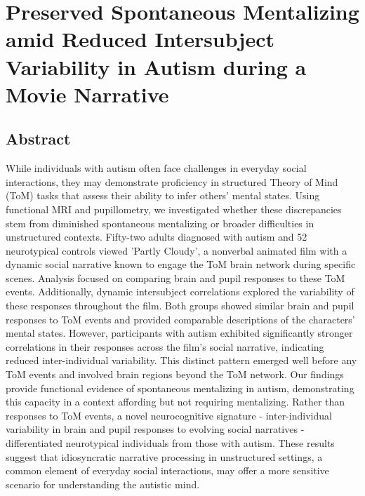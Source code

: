 \chapter{Preserved Spontaneous Mentalizing amid Reduced Intersubject Variability in Autism during a Movie Narrative}
\label{ch:mentalizing_asc}

\section*{Abstract}
While individuals with autism often face challenges in everyday social interactions, they may demonstrate proficiency in structured Theory of Mind (ToM) tasks that assess their ability to infer others' mental states. Using functional MRI and pupillometry, we investigated whether these discrepancies stem from diminished spontaneous mentalizing or broader difficulties in unstructured contexts. Fifty-two adults diagnosed with autism and 52 neurotypical controls viewed 'Partly Cloudy', a nonverbal animated film with a dynamic social narrative known to engage the ToM brain network during specific scenes. Analysis focused on comparing brain and pupil responses to these ToM events. Additionally, dynamic intersubject correlations explored the variability of these responses throughout the film. Both groups showed similar brain and pupil responses to ToM events and provided comparable descriptions of the characters' mental states. However, participants with autism exhibited significantly stronger correlations in their responses across the film's social narrative, indicating reduced inter-individual variability. This distinct pattern emerged well before any ToM events and involved brain regions beyond the ToM network. Our findings provide functional evidence of spontaneous mentalizing in autism, demonstrating this capacity in a context affording but not requiring mentalizing. Rather than responses to ToM events, a novel neurocognitive signature - inter-individual variability in brain and pupil responses to evolving social narratives - differentiated neurotypical individuals from those with autism. These results suggest that idiosyncratic narrative processing in unstructured settings, a common element of everyday social interactions, may offer a more sensitive scenario for understanding the autistic mind.

\thispagestyle{empty}
